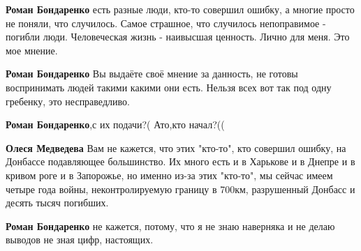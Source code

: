 \begin{itemize}
\begin{itemize}
 
\textbf{Роман Бондаренко} есть разные люди, кто-то совершил ошибку, а многие
просто не поняли, что случилось. Самое страшное, что случилось непоправимое -
погибли люди. Человеческая жизнь - наивысшая ценность. Лично для меня. Это мое
мнение.

 
\textbf{Роман Бондаренко} Вы выдаёте своё мнение за данность, не готовы
воспринимать людей такими какими они есть. Нельзя всех вот так под одну
гребенку, это несправедливо.

 
\textbf{Роман Бондаренко},с их подачи?( Ато,кто начал?((

 
\textbf{Олеся Медведева} Вам не кажется, что этих "кто-то", кто совершил
ошибку, на Донбассе подавляющее большинство. Их много есть и в Харькове и в
Днепре и в кривом роге и в Запорожье, но именно из-за этих "кто-то", мы сейчас
имеем четыре года войны, неконтролируемую границу в 700км, разрушенный Донбасс
и десять тысяч погибших.

 
\textbf{Роман Бондаренко} не кажется, потому, что я не знаю наверняка и не делаю выводов не зная цифр, настоящих.


\end{itemize}
\end{itemize}
